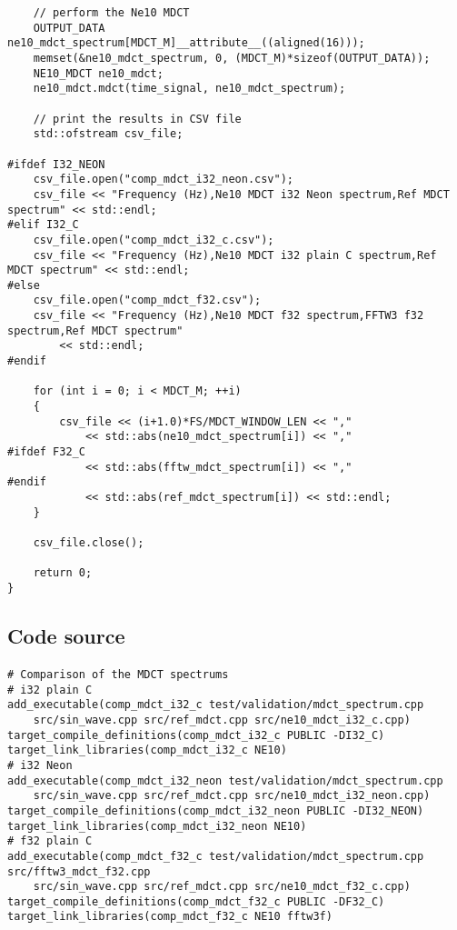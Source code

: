 \documentclass{article}
\begin{document}
\begin{lstlisting}
    // perform the Ne10 MDCT
    OUTPUT_DATA ne10_mdct_spectrum[MDCT_M]__attribute__((aligned(16)));
    memset(&ne10_mdct_spectrum, 0, (MDCT_M)*sizeof(OUTPUT_DATA));
    NE10_MDCT ne10_mdct;
    ne10_mdct.mdct(time_signal, ne10_mdct_spectrum);

    // print the results in CSV file
    std::ofstream csv_file;

#ifdef I32_NEON
    csv_file.open("comp_mdct_i32_neon.csv");
    csv_file << "Frequency (Hz),Ne10 MDCT i32 Neon spectrum,Ref MDCT spectrum" << std::endl;
#elif I32_C
    csv_file.open("comp_mdct_i32_c.csv");
    csv_file << "Frequency (Hz),Ne10 MDCT i32 plain C spectrum,Ref MDCT spectrum" << std::endl;
#else
    csv_file.open("comp_mdct_f32.csv");
    csv_file << "Frequency (Hz),Ne10 MDCT f32 spectrum,FFTW3 f32 spectrum,Ref MDCT spectrum"
        << std::endl;
#endif

    for (int i = 0; i < MDCT_M; ++i)
    {
        csv_file << (i+1.0)*FS/MDCT_WINDOW_LEN << ","
            << std::abs(ne10_mdct_spectrum[i]) << ","
#ifdef F32_C
            << std::abs(fftw_mdct_spectrum[i]) << ","
#endif
            << std::abs(ref_mdct_spectrum[i]) << std::endl;
    }

    csv_file.close();

    return 0;
}
\end{lstlisting}

\subsection{Code source}\label{app:spectrum_comparison_cmake}
\paragraph{}
\lstset{language=make}
\begin{lstlisting}
# Comparison of the MDCT spectrums
# i32 plain C
add_executable(comp_mdct_i32_c test/validation/mdct_spectrum.cpp
    src/sin_wave.cpp src/ref_mdct.cpp src/ne10_mdct_i32_c.cpp)
target_compile_definitions(comp_mdct_i32_c PUBLIC -DI32_C)
target_link_libraries(comp_mdct_i32_c NE10)
# i32 Neon
add_executable(comp_mdct_i32_neon test/validation/mdct_spectrum.cpp
    src/sin_wave.cpp src/ref_mdct.cpp src/ne10_mdct_i32_neon.cpp)
target_compile_definitions(comp_mdct_i32_neon PUBLIC -DI32_NEON)
target_link_libraries(comp_mdct_i32_neon NE10)
# f32 plain C
add_executable(comp_mdct_f32_c test/validation/mdct_spectrum.cpp src/fftw3_mdct_f32.cpp
    src/sin_wave.cpp src/ref_mdct.cpp src/ne10_mdct_f32_c.cpp)
target_compile_definitions(comp_mdct_f32_c PUBLIC -DF32_C)
target_link_libraries(comp_mdct_f32_c NE10 fftw3f)
\end{lstlisting}
\end{document}
